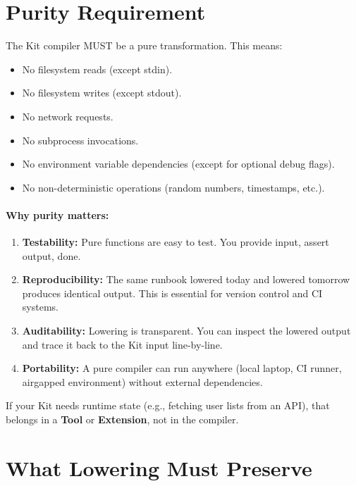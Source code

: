 \section{Purity Requirement}
\label{sec:purity}

The Kit compiler MUST be a pure transformation. This means:

\begin{itemize}
  \item No filesystem reads (except stdin).
  \item No filesystem writes (except stdout).
  \item No network requests.
  \item No subprocess invocations.
  \item No environment variable dependencies (except for optional debug flags).
  \item No non-deterministic operations (random numbers, timestamps, etc.).
\end{itemize}

\paragraph{Why purity matters:}

\begin{enumerate}
  \item \textbf{Testability:} Pure functions are easy to test. You provide
    input, assert output, done.
  \item \textbf{Reproducibility:} The same runbook lowered today and lowered
    tomorrow produces identical output. This is essential for version control
    and CI systems.
  \item \textbf{Auditability:} Lowering is transparent. You can inspect the
    lowered output and trace it back to the Kit input line-by-line.
  \item \textbf{Portability:} A pure compiler can run anywhere (local laptop,
    CI runner, airgapped environment) without external dependencies.
\end{enumerate}

If your Kit needs runtime state (e.g., fetching user lists from an API),
that belongs in a \textbf{Tool} or \textbf{Extension}, not in the compiler.

\section{What Lowering Must Preserve}
\label{sec:must-preserve}

